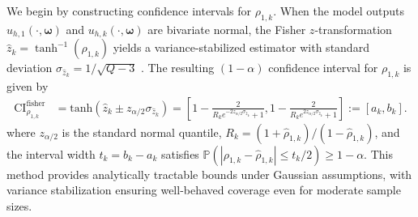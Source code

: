 We begin by constructing confidence intervals for $\rho_{1,k}$. When the model outputs $u_{h,1}(\cdot, \boldsymbol{\omega})$ and $u_{h,k}(\cdot, \boldsymbol{\omega})$ are bivariate normal, the Fisher $z$-transformation $\widehat z_k = \tanh^{-1}(\widehat \rho_{1,k})$ yields a variance-stabilized estimator with standard deviation $\sigma_{\widehat z_k} = 1/\sqrt{Q - 3}$ \cite{BiHi:2017,BoWr:1998, FiHaPe:1957,Fi:1915, Fi:1921}. The resulting $(1 - \alpha)$ confidence interval for $\rho_{1,k}$ is given by
%
\begin{align}
    \label{eq:Confidence_Interval_fisher}
    \text{CI}_{\rho_{1,k}}^{\text{fisher}} &= \text{tanh}\left(\widehat z_k \pm  z_{\alpha/2}\sigma_{\widehat z_k}\right)
    =\left[1-\frac{2}{R_k e^{-2z_{\alpha/2}\sigma_{\widehat z_k}}+1}, 1-\frac{2}{R_k e^{2z_{\alpha/2}\sigma_{\widehat z_k}}+1}\right] := [a_k,b_k].
\end{align}
%
where $z_{\alpha/2}$ is the standard normal quantile, $R_k = (1+\widehat\rho_{1,k})/(1-\widehat\rho_{1,k})$, and the interval width $t_k = b_k - a_k$ satisfies $\mathbb{P}(|\rho_{1,k} - \widehat{\rho}_{1,k}| \leq t_k/2) \geq 1 - \alpha$. This method provides analytically tractable bounds under Gaussian assumptions, with variance stabilization ensuring well-behaved coverage even for moderate sample sizes.

